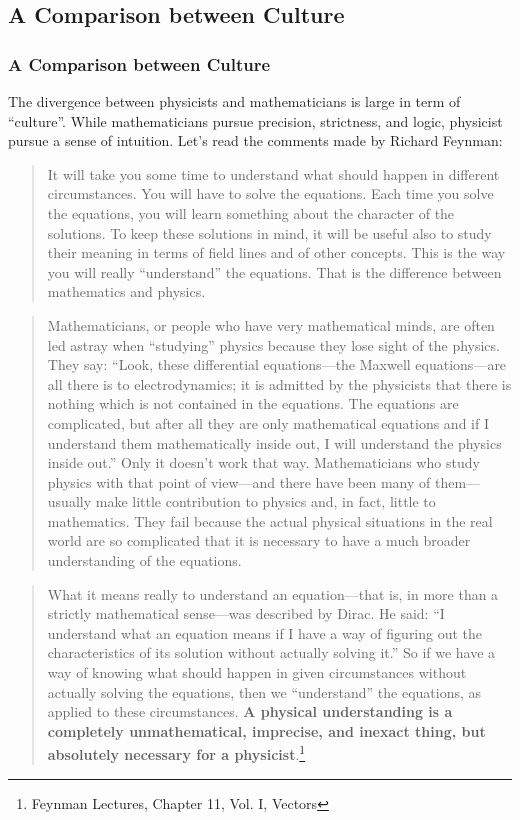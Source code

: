 \documentclass[11pt, t]{beamer}
\begin{document}
\subsection{A Comparison between Culture}
\begin{frame}[allowframebreaks]
    \frametitle{A Comparison between Culture}
    The divergence between physicists and mathematicians is large in term of ``culture''. While mathematicians pursue precision, strictness, and logic, physicist pursue a sense of intuition. Let's read the comments made by Richard Feynman:
    \begin{quote}
        It will take you some time to understand what should happen in different circumstances. You will have to solve the equations. Each time you solve the equations, you will learn something about the character of the solutions. To keep these solutions in mind, it will be useful also to study their meaning in terms of field lines and of other concepts. This is the way you will really “understand” the equations. That is the difference between mathematics and physics.
    \end{quote}
    \begin{quote}
        Mathematicians, or people who have very mathematical minds, are often led astray when “studying” physics because they lose sight of the physics. They say: “Look, these differential equations—the Maxwell equations—are all there is to electrodynamics; it is admitted by the physicists that there is nothing which is not contained in the equations. The equations are complicated, but after all they are only mathematical equations and if I understand them mathematically inside out, I will understand the physics inside out.” Only it doesn’t work that way. Mathematicians who study physics with that point of view—and there have been many of them—usually make little contribution to physics and, in fact, little to mathematics. They fail because the actual physical situations in the real world are so complicated that it is necessary to have a much broader understanding of the equations.
    \end{quote}
    \begin{quote}
        What it means really to understand an equation—that is, in more than a strictly mathematical sense—was described by Dirac. He said: “I understand what an equation means if I have a way of figuring out the characteristics of its solution without actually solving it.” So if we have a way of knowing what should happen in given circumstances without actually solving the equations, then we “understand” the equations, as applied to these circumstances. \textbf{A physical understanding is a completely unmathematical, imprecise, and inexact thing, but absolutely necessary for a physicist}.\footnote[frame]{Feynman Lectures, Chapter 11, Vol. I, Vectors}
    \end{quote}
    

\end{frame}
\end{document}
